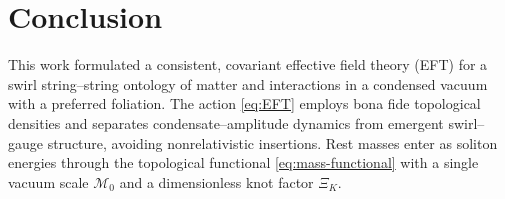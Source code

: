 \documentclass[preprint,titlepage]{revtex4-2}
\begin{document}
    

    

    

    

    

    

    \section{Conclusion}

    This work formulated a consistent, covariant effective field theory (EFT) for a swirl string–string ontology of matter and interactions in a condensed vacuum with a preferred foliation. The action \eqref{eq:EFT} employs bona fide topological densities and separates condensate–amplitude dynamics from emergent swirl–gauge structure, avoiding nonrelativistic insertions. Rest masses enter as soliton energies through the topological functional \eqref{eq:mass-functional} with a single vacuum scale \(\mathcal{M}_0\) and a dimensionless knot factor \(\Xi_K\).
\end{document}
